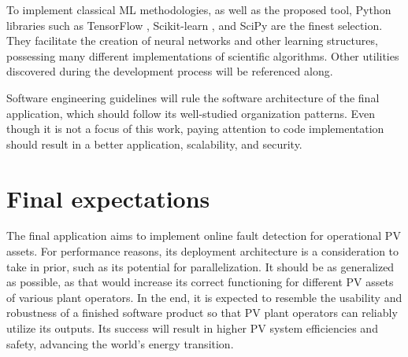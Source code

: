To implement classical ML methodologies, as well as the proposed tool, Python libraries such as TensorFlow \cite{tensorflow}, Scikit-learn \cite{sklearn}, and SciPy \cite{scipy} are the finest selection. They facilitate the creation of neural networks and other learning structures, possessing many different implementations of scientific algorithms. Other utilities discovered during the development process will be referenced along.

Software engineering guidelines will rule the software architecture of the final application, which should follow its well-studied organization patterns. Even though it is not a focus of this work, paying attention to code implementation should result in a better application, scalability, and security.


\section{Final expectations}

The final application aims to implement online fault detection for operational PV assets. For performance reasons, its deployment architecture is a consideration to take in prior, such as its potential for parallelization. It should be as generalized as possible, as that would increase its correct functioning for different PV assets of various plant operators. In the end, it is expected to resemble the usability and robustness of a finished software product so that PV plant operators can reliably utilize its outputs. Its success will result in higher PV system efficiencies and safety, advancing the world's energy transition.


